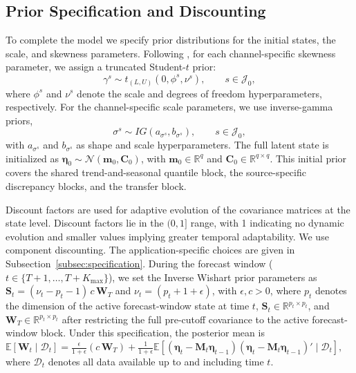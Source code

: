 \documentclass[APA,STIX1COL]{WileyNJD-v2}
\begin{document}
\subsection{Prior Specification and Discounting}
\label{subsec:prioranddisc}
To complete the model we specify prior distributions for the initial states, the scale, and skewness parameters.
Following \citet{barata2021_flex_quantile}, for each channel-specific skewness parameter, we assign a truncated Student-\(t\) prior:
\[
\gamma^s \sim t_{(L,U)}(0,\phi^s,\nu^s), \qquad s\in\mathcal{J}_0,
\]
where \(\phi^s\) and \(\nu^s\) denote the scale and degrees of freedom hyperparameters, respectively. For the channel-specific scale parameters, we use inverse-gamma priors,
\[
\sigma^s \sim IG(a_{\sigma^s}, b_{\sigma^s}), \qquad s\in\mathcal{J}_0,
\]
with \(a_{\sigma^s}\) and \(b_{\sigma^s}\) as shape and scale hyperparameters. The full latent state is initialized as \(\boldsymbol{\eta}_0 \sim \mathcal{N}(\mathbf{m}_0, \mathbf{C}_0)\), with \(\mathbf{m}_0 \in \mathbb{R}^{q}\) and \(\mathbf{C}_0 \in \mathbb{R}^{q\times q}\). This initial prior covers the shared trend-and-seasonal quantile block, the source-specific discrepancy blocks, and the transfer block.

Discount factors \citep{prado2021time} are used for adaptive evolution of the covariance matrices at the state level. Discount factors lie in the $(0,1]$ range, with 1 indicating no dynamic evolution and smaller values implying greater temporal adaptability. We use component discounting. The application-specific choices are given in Subsection~\ref{subsec:specification}. During the forecast window ($t \in \{T+1, \ldots, T+K_{\max}\}$), we set the Inverse Wishart prior parameters as $\mathbf{S}_t = (\nu_t - p_t - 1)\, c\, \mathbf{W}_T$ and $\nu_t = (p_t + 1 + \epsilon)$, with $\epsilon, c > 0$, where \(p_t\) denotes the dimension of the active forecast-window state at time \(t\), \(\mathbf{S}_t \in \mathbb{R}^{p_t\times p_t}\), and \(\mathbf{W}_T \in \mathbb{R}^{p_t\times p_t}\) after restricting the full pre-cutoff covariance to the active forecast-window block. Under this specification, the posterior mean is
\(
\mathbb{E}[\mathbf{W}_t \mid \mathcal{D}_t] = \frac{\epsilon}{1 + \epsilon}(c\, \mathbf{W}_T) + \frac{1}{1 + \epsilon} \mathbb{E}\left[ (\boldsymbol{\eta}_t - \mathbf{M}_t \boldsymbol{\eta}_{t-1}) (\boldsymbol{\eta}_t - \mathbf{M}_t \boldsymbol{\eta}_{t-1})' \mid \mathcal{D}_t \right],
\)
where $\mathcal{D}_t$ denotes all data available up to and including time $t$.
\end{document}
